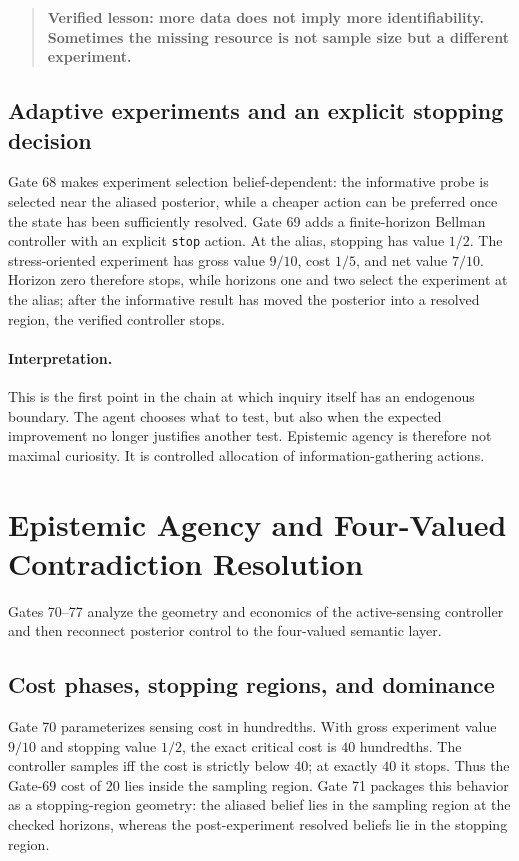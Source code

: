 \begin{quote}
\textbf{Verified lesson: more data does not imply more identifiability. Sometimes the missing resource is not sample size but a different experiment.}
\end{quote}

\subsection{Adaptive experiments and an explicit stopping decision}

Gate 68 makes experiment selection belief-dependent: the informative probe is selected near the aliased posterior, while a cheaper action can be preferred once the state has been sufficiently resolved. Gate 69 adds a finite-horizon Bellman controller with an explicit \texttt{stop} action. At the alias, stopping has value $1/2$. The stress-oriented experiment has gross value $9/10$, cost $1/5$, and net value $7/10$. Horizon zero therefore stops, while horizons one and two select the experiment at the alias; after the informative result has moved the posterior into a resolved region, the verified controller stops.

\paragraph{Interpretation.}
This is the first point in the chain at which inquiry itself has an endogenous boundary. The agent chooses what to test, but also when the expected improvement no longer justifies another test. Epistemic agency is therefore not maximal curiosity. It is controlled allocation of information-gathering actions.


\section{Epistemic Agency and Four-Valued Contradiction Resolution}

Gates 70--77 analyze the geometry and economics of the active-sensing controller and then reconnect posterior control to the four-valued semantic layer.

\subsection{Cost phases, stopping regions, and dominance}

Gate 70 parameterizes sensing cost in hundredths. With gross experiment value $9/10$ and stopping value $1/2$, the exact critical cost is $40$ hundredths. The controller samples iff the cost is strictly below $40$; at exactly $40$ it stops. Thus the Gate-69 cost of $20$ lies inside the sampling region. Gate 71 packages this behavior as a stopping-region geometry: the aliased belief lies in the sampling region at the checked horizons, whereas the post-experiment resolved beliefs lie in the stopping region.

